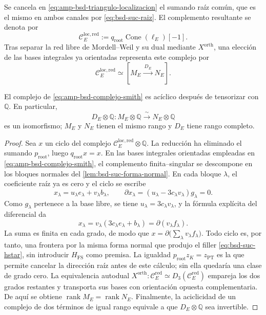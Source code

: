 Se cancela en \eqref{eq:amp-bsd-triangulo-localizacion} el sumando raíz
común, que es el mismo en ambos canales por
\eqref{eq:bsd-suc-raiz}. El complemento resultante se denota por
\begin{equation}\label{eq:amp-bsd-cono-local-reducido}
 \mathcal C_E^{\mathrm{loc,red}}
 :=q_{\mathrm{root}}\operatorname{Cone}(\ell_E)[-1].
\end{equation}
Tras separar la red libre de Mordell--Weil y su dual mediante
\(X^{\mathrm{orth}}\), una elección de las bases integrales ya orientadas
representa este complejo por
\begin{equation}\label{eq:amp-bsd-complejo-smith}
 \mathcal C_E^{\mathrm{loc,red}}
 \simeq[M_E\xrightarrow{\ D_E\ }N_E].
\end{equation}

\begin{lemma}
\label{lem:amp-bsd-aciclicidad-rango}
El complejo de \eqref{eq:amp-bsd-complejo-smith} es acíclico después de
tensorizar con \(\mathbb Q\). En particular,
\[
 D_E\otimes\mathbb Q:M_E\otimes\mathbb Q
 \xrightarrow{\ \sim\ }N_E\otimes\mathbb Q
\]
es un isomorfismo; \(M_E\) y \(N_E\) tienen el mismo rango y \(D_E\) tiene
rango completo.
\end{lemma}

\begin{proof}
Sea \(x\) un ciclo del complejo
\(\mathcal C_E^{\mathrm{loc,red}}\otimes\mathbb Q\). La reducción ha
eliminado el sumando \(p_{\mathrm{root}}\), luego
\(q_{\mathrm{root}}x=x\). En las bases integrales orientadas empleadas en
\eqref{eq:amp-bsd-complejo-smith}, el complemento finita--singular se
descompone en los bloques normales del
\cref{lem:bsd-suc-forma-normal}. En cada bloque \(\lambda\), el coeficiente
raíz ya es cero y el ciclo se escribe
\[
 x_{\lambda}=u_{\lambda}e_{\lambda}
                  +v_{\lambda}b_{\lambda},
 \qquad
 \partial x_{\lambda}
   =(u_{\lambda}-3c_{\lambda}v_{\lambda})g_{\lambda}=0.
\]
Como \(g_{\lambda}\) pertenece a la base libre, se tiene
\(u_{\lambda}=3c_{\lambda}v_{\lambda}\), y la fórmula explícita del
diferencial da
\[
 x_{\lambda}
   =v_{\lambda}(3c_{\lambda}e_{\lambda}+b_{\lambda})
   =\partial(v_{\lambda}f_{\lambda}).
\]
La suma es finita en cada grado, de modo que
\(x=\partial\bigl(\sum_{\lambda}v_{\lambda}f_{\lambda}\bigr)\).
Todo ciclo es, por tanto, una frontera por la misma forma normal que produjo
el filler \eqref{eq:bsd-suc-hstar}, sin introducir
\(H_{\mathrm{FS}}\) como premisa. La igualdad
\(p_{\mathrm{root}}z_K=z_{\mathrm{PT}}\) es la que permite cancelar la
dirección raíz antes de este cálculo; sin ella quedaría una clase de grado
cero. La equivalencia autodual
\(X^{\mathrm{orth}}:\mathcal C_E^{\mathrm{red}}\simeq
D_3(\mathcal C_E^{\mathrm{red}})\) empareja los dos grados restantes y
transporta sus bases con orientación opuesta complementaria. De aquí se
obtiene \(\operatorname{rank}M_E=\operatorname{rank}N_E\).
Finalmente, la aciclicidad de un complejo de dos términos de igual rango
equivale a que \(D_E\otimes\mathbb Q\) sea invertible.
\end{proof}

